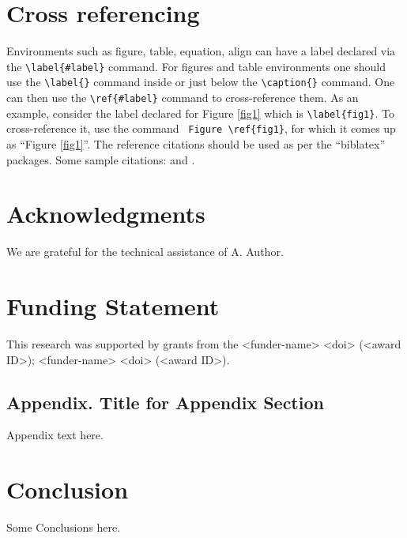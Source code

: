 \documentclass[autowc]{CUP-JNL-PPS}
\begin{document}
\section{Cross referencing}

Environments such as figure, table, equation, align can have a label
declared via the \verb+\label{#label}+ command. For figures and table
environments one should use the \verb+\label{}+ command inside or just
below the \verb+\caption{}+ command.  One can then use the
\verb+\ref{#label}+ command to cross-reference them. As an example, consider
the label declared for Figure \ref{fig1} which is
\verb+\label{fig1}+. To cross-reference it, use the command
\verb+ Figure \ref{fig1}+, for which it comes up as
``Figure \ref{fig1}''.
The reference citations should be used as per the ``biblatex'' packages. Some sample citations:  
\cite{ctan} and \parencite{dirac,einstein,knuth-acp,knuth-fa,knuthwebsite,latexcompanion}.

\section{Acknowledgments}
We are grateful for the technical assistance of A. Author.


\section{Funding Statement}
This research was supported by grants from the <funder-name> <doi> (<award ID>); <funder-name> <doi> (<award ID>).

\begin{appendix}\appheader
\section{Appendix. Title for Appendix Section}\label{appendixA}
Appendix text here.
\end{appendix}

\theendnotes

\section{Conclusion}

Some Conclusions here.
\end{document}
